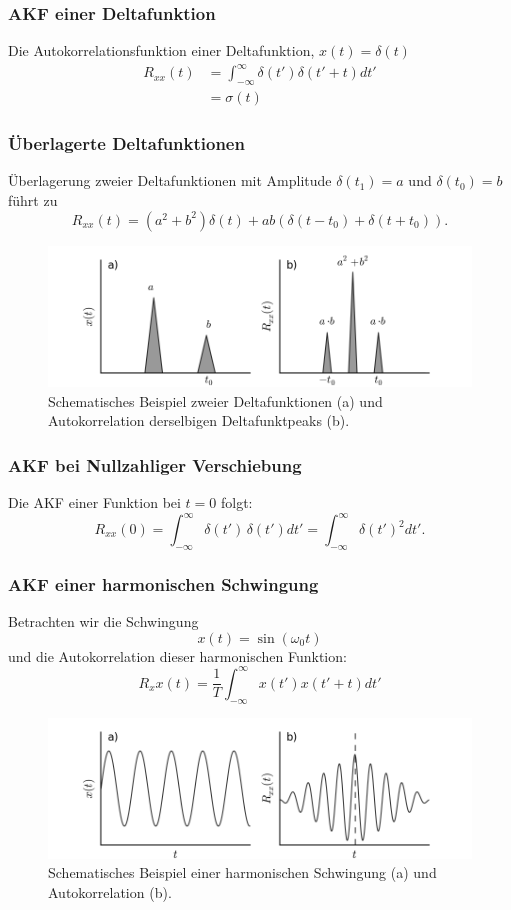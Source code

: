 \subsubsection*{AKF einer Deltafunktion}
Die Autokorrelationsfunktion einer Deltafunktion, $x(t) = \delta(t)$
\begin{align*}
R_{xx}(t) & = \int_{-\infty}^\infty \delta(t') \delta(t'+t) dt'\\
& = \sigma(t)
\end{align*}

\subsubsection*{Überlagerte Deltafunktionen}
Überlagerung zweier Deltafunktionen mit Amplitude $\delta(t_1) = a$ und $\delta(t_0) = b$ führt zu
\[
R_{xx}(t) = (a^2 + b^2)\delta(t) + ab(\delta(t-t_0) + \delta(t+t_0)).
\]

\begin{figure}[h!]
\centering
\includegraphics[width=.9\tw]{fig/07-Korrelation/02-example_deltafct.png}
\caption{Schematisches Beispiel zweier Deltafunktionen (a) und Autokorrelation derselbigen Deltafunktpeaks (b).}
\end{figure}

\subsubsection*{AKF bei Nullzahliger Verschiebung}
Die AKF einer Funktion bei $t=0$ folgt:
\[
R_{xx}(0) = \int_{-\infty}^\infty \delta(t')\,\delta(t') dt' = \int_{-\infty}^\infty \delta(t')^2 dt'.
\]


\subsubsection*{AKF einer harmonischen Schwingung}
Betrachten wir die Schwingung
\[
x(t) = \sin(\omega_0 t)
\]
und die Autokorrelation dieser harmonischen Funktion:
\[
R_xx(t) = \frac{1}{T} \int_{-\infty}^\infty x(t') x(t'+t) dt'
\]
\begin{figure}[h!]
\centering
\includegraphics[width=.9\tw]{fig/07-Korrelation/03-example_harmonic.png}
\caption{Schematisches Beispiel einer harmonischen Schwingung (a) und Autokorrelation (b).}
\end{figure}

